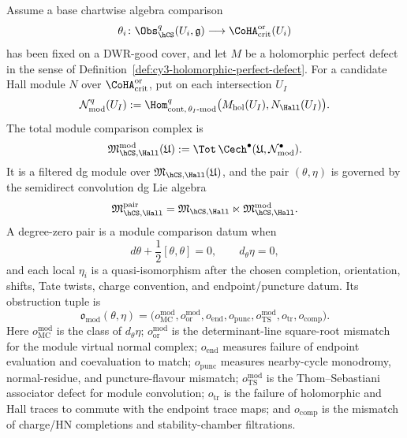 \begin{definition}
\label{def:hcs-hall-module-obstruction}
Assume a base chartwise algebra comparison
\[
 \theta_i\colon
 \Obs_{\hCS}^{q}(U_i,\mathfrak g)
 \longrightarrow
 \CoHA_{\mathrm{crit}}^{\mathrm{or}}(U_i)
\]
has been fixed on a DWR-good cover, and let $M$ be a holomorphic
perfect defect in the sense of
Definition~\ref{def:cy3-holomorphic-perfect-defect}. For a candidate
Hall module $N$ over $\CoHA_{\mathrm{crit}}^{\mathrm{or}}$, put on each
intersection $U_I$
\[
 \mathcal N_{\mathrm{mod}}^q(U_I)
 :=
 \Hom^q_{\mathrm{cont},\,\theta_I\text{-}\mathrm{mod}}
 \bigl(M_{\mathrm{hol}}(U_I),N_{\Hall}(U_I)\bigr).
\]
The total module comparison complex is
\[
 \mathfrak M_{\hCS,\Hall}^{\mathrm{mod}}(\mathfrak U)
 :=
 \Tot\,\Cech^\bullet(\mathfrak U,\mathcal N_{\mathrm{mod}}^\bullet).
\]
It is a filtered dg module over
$\mathfrak M_{\hCS,\Hall}(\mathfrak U)$, and the pair
$(\theta,\eta)$ is governed by the semidirect convolution dg Lie algebra
\[
 \mathfrak M_{\hCS,\Hall}^{\mathrm{pair}}
 =
 \mathfrak M_{\hCS,\Hall}
 \ltimes
 \mathfrak M_{\hCS,\Hall}^{\mathrm{mod}}.
\]
A degree-zero pair is a module comparison datum when
\[
 d\theta+\frac12[\theta,\theta]=0,
 \qquad
 d_\theta\eta=0,
\]
and each local $\eta_i$ is a quasi-isomorphism after the chosen
completion, orientation, shifts, Tate twists, charge convention, and
endpoint/puncture datum. Its obstruction tuple is
\[
 \mathfrak o_{\mathrm{mod}}(\theta,\eta)
 =
 \bigl(
 o_{\mathrm{MC}}^{\mathrm{mod}},
 o_{\mathrm{or}}^{\mathrm{mod}},
 o_{\mathrm{end}},
 o_{\mathrm{punc}},
 o_{\mathrm{TS}}^{\mathrm{mod}},
 o_{\mathrm{tr}},
 o_{\mathrm{comp}}
 \bigr).
\]
Here $o_{\mathrm{MC}}^{\mathrm{mod}}$ is the class of
$d_\theta\eta$; $o_{\mathrm{or}}^{\mathrm{mod}}$ is the determinant-line
square-root mismatch for the module virtual normal complex;
$o_{\mathrm{end}}$ measures failure of endpoint evaluation and
coevaluation to match; $o_{\mathrm{punc}}$ measures nearby-cycle
monodromy, normal-residue, and puncture-flavour mismatch;
$o_{\mathrm{TS}}^{\mathrm{mod}}$ is the Thom--Sebastiani associator
defect for module convolution; $o_{\mathrm{tr}}$ is the failure of
holomorphic and Hall traces to commute with the endpoint trace maps; and
$o_{\mathrm{comp}}$ is the mismatch of charge/HN completions and
stability-chamber filtrations.
\end{definition}

